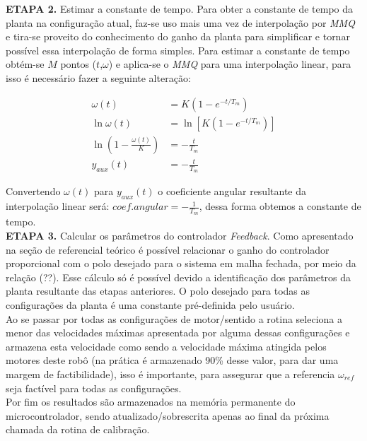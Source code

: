     
\textbf{ETAPA 2.} Estimar a constante de tempo. Para obter a constante de tempo da planta na configuração atual, faz-se uso mais uma vez de interpolação por \textit{MMQ} e tira-se proveito do conhecimento do ganho da planta para simplificar e tornar possível essa interpolação de forma simples. Para estimar a constante de tempo obtém-se $M$ pontos ($t$,$\omega$) e aplica-se o \textit{MMQ} para uma interpolação linear, para isso é necessário fazer a seguinte alteração:
    

\begin{align*}
    \omega(t) &= K\left( 1 - e^{-t/T_m} \right)\\
    \ln{\omega(t)} &= \ln\left[K( 1 - e^{-t/T_m})\right]\\
    \ln\left(1 - \frac{\omega(t)}{K} \right) &= -\frac{t}{T_m}\\
    y_{aux}(t) &= -\frac{t}{T_m}
\end{align*}

Convertendo $\omega(t)$ para $y_{aux}(t)$ o coeficiente angular resultante da interpolação linear será: $coef.angular = -\frac{1}{T_m}$, dessa forma obtemos a constante de tempo.\\

\textbf{ETAPA 3.} Calcular os parâmetros do controlador \textit{Feedback}. Como apresentado na seção de referencial teórico é possível relacionar o ganho do controlador proporcional com o polo desejado para o sistema em malha fechada, por meio da relação (??). Esse cálculo só é possível devido a identificação dos parâmetros da planta resultante das etapas anteriores. O polo desejado para todas as configurações da planta é uma constante pré-definida pelo usuário.\\
    

Ao se passar por todas as configurações de motor/sentido a rotina seleciona a menor das velocidades máximas apresentada por alguma dessas configurações e armazena esta velocidade como sendo a velocidade máxima atingida pelos motores deste robô (na prática é armazenado 90\% desse valor, para dar uma margem de factibilidade), isso é importante, para assegurar que a referencia $\omega_{ref}$ seja factível para todas as configurações. \\

Por fim os resultados são armazenados na memória permanente do microcontrolador, sendo atualizado/sobrescrita apenas ao final da próxima chamada da rotina de calibração.

